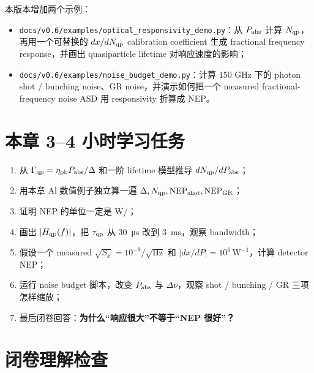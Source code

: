 \documentclass[11pt,a4paper,openany]{ctexrep}
\begin{document}
本版本增加两个示例：
\begin{itemize}
  \item \texttt{docs/v0.6/examples/optical\_responsivity\_demo.py}：从 $P_{\rm abs}$ 计算 $N_{\rm qp}$，再用一个可替换的 $dx/dN_{\rm qp}$ calibration coefficient 生成 fractional frequency response，并画出 quasiparticle lifetime 对响应速度的影响；
  \item \texttt{docs/v0.6/examples/noise\_budget\_demo.py}：计算 150 GHz 下的 photon shot / bunching noise、GR noise，并演示如何把一个 measured fractional-frequency noise ASD 用 responsivity 折算成 NEP。
\end{itemize}

\section{本章 3--4 小时学习任务}

\begin{enumerate}
  \item 从 $\Gamma_{\rm qp}=\eta_{\rm pb}P_{\rm abs}/\Delta$ 和一阶 lifetime 模型推导 $dN_{\rm qp}/dP_{\rm abs}$；
  \item 用本章 Al 数值例子独立算一遍 $\Delta,N_{\rm qp},\mathrm{NEP}_{\rm shot},\mathrm{NEP}_{\rm GR}$；
  \item 证明 NEP 的单位一定是 \si{W/}；
  \item 画出 $|H_{\rm qp}(f)|$，把 $\tau_{\rm qp}$ 从 \SI{30}{\micro s} 改到 \SI{3}{ms}，观察 bandwidth；
  \item 假设一个 measured $\sqrt{S_x}=10^{-9}/\sqrt{\mathrm{Hz}}$ 和 $|dx/dP|=10^6\,\mathrm{W^{-1}}$，计算 detector NEP；
  \item 运行 noise budget 脚本，改变 $P_{\rm abs}$ 与 $\Delta\nu$，观察 shot / bunching / GR 三项怎样缩放；
  \item 最后闭卷回答：\textbf{为什么“响应很大”不等于“NEP 很好”？}
\end{enumerate}

\section{闭卷理解检查}
\end{document}
